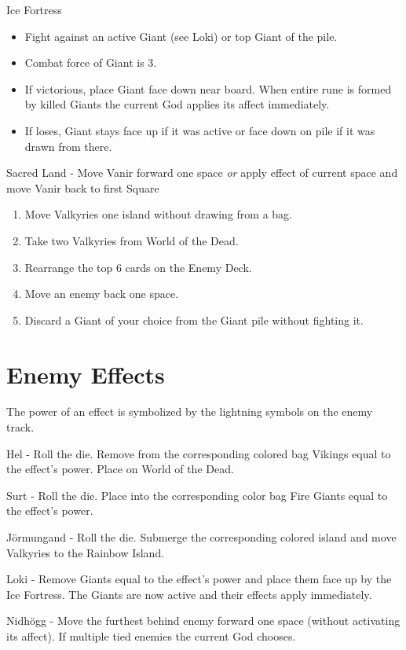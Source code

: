 \documentclass[12pt]{article}
\newenvironment{enumerateCustom}
{\begin{enumerate}
  \setlength{\itemsep}{1pt}
  \setlength{\parskip}{0pt}
  \setlength{\parsep}{0pt}}
{\end{enumerate}}
\newenvironment{itemizeCustom}
{\begin{itemize}
  \setlength{\itemsep}{1pt}
  \setlength{\parskip}{0pt}
  \setlength{\parsep}{0pt}}
{\end{itemize}}
\begin{document}
\begin{multicols*}{2}
\noindent
Ice Fortress 
\begin{itemizeCustom}
	\item Fight against an active Giant (see Loki) or top Giant of the pile.
	\item Combat force of Giant is 3.
	\item If victorious, place Giant face down near board. When entire rune is formed by killed Giants the current God applies its affect immediately.
	\item If loses, Giant stays face up if it was active or face down on pile if it was drawn from there.
\end{itemizeCustom}

\noindent
Sacred Land - Move Vanir forward one space \emph{or} apply effect of current space and move Vanir back to first Square
\begin{enumerateCustom}
	\item Move Valkyries one island without drawing from a bag.
	\item Take two Valkyries from World of the Dead.
	\item Rearrange the top 6 cards on the Enemy Deck.
	\item Move an enemy back one space.
	\item Discard a Giant of your choice from the Giant pile without fighting it.
\end{enumerateCustom}

\section*{Enemy Effects}
The power of an effect is symbolized by the lightning symbols on the enemy track.

\noindent
Hel - Roll the die. Remove from the corresponding colored bag Vikings equal to the effect's power. Place on World of the Dead.

\noindent
Surt - Roll the die. Place into the corresponding color bag Fire Giants equal to the effect's power.

\noindent
J\"ormungand - Roll the die. Submerge the corresponding colored island and move Valkyries to the Rainbow Island.

\noindent
Loki - Remove Giants equal to the effect's power and place them face up by the Ice Fortress. The Giants are now active and their effects apply immediately.

\noindent
Nidh\"ogg - Move the furthest behind enemy forward one space (without activating its affect). If multiple tied enemies the current God chooses.


\end{multicols*}
\end{document}
